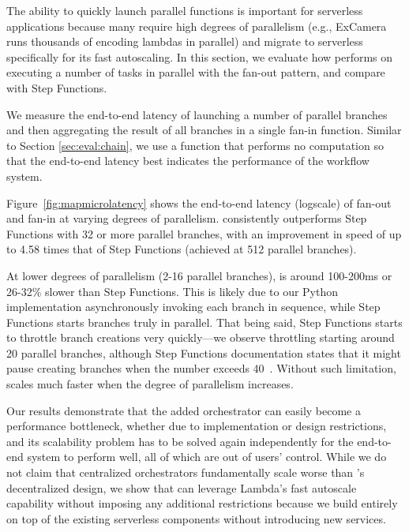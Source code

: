 The ability to quickly launch parallel functions is important for serverless
applications because many require high degrees of parallelism (e.g., ExCamera
runs thousands of encoding lambdas in parallel) and migrate to serverless
specifically for its fast autoscaling. In this section, we evaluate how
\name{} performs on executing a number of tasks in parallel with the fan-out
pattern, and compare with Step Functions.

We measure the end-to-end latency of launching a number of parallel branches
and then aggregating the result of all branches in a single fan-in function.
Similar to Section \ref{sec:eval:chain}, we use a function that performs no
computation so that the end-to-end latency best indicates the performance of
the workflow system.


Figure~\ref{fig:mapmicrolatency} shows the end-to-end latency (logscale) of
fan-out and fan-in at varying degrees of parallelism. \name{} consistently
outperforms Step Functions with 32 or more parallel branches, with an
improvement in speed of up to 4.58 times that of Step Functions (achieved at
512 parallel branches).

At lower degrees of parallelism (2-16 parallel branches), \name{} is around
100-200ms or 26-32\% slower than Step Functions. This is likely due to our
Python implementation asynchronously invoking each branch in sequence, while
Step Functions starts branches truly in parallel. That being said, Step
Functions starts to throttle branch creations very quickly---we observe
throttling starting around 20 parallel branches, although Step Functions
documentation states that it might pause creating branches when the number
exceeds 40~\cite{aws-step-functions-map-state}. Without such limitation,
\name{} scales much faster when the degree of parallelism increases.

Our results demonstrate that the added orchestrator can easily become a
performance bottleneck, whether due to implementation or design restrictions,
and its scalability problem has to be solved again independently for the
end-to-end system to perform well, all of which are out of users' control.
While we do not claim that centralized orchestrators fundamentally scale worse
than \name{}'s decentralized design, we show that \name{} can leverage
Lambda's fast autoscale capability without imposing any additional
restrictions because we build entirely on top of the existing serverless
components without introducing new services.



